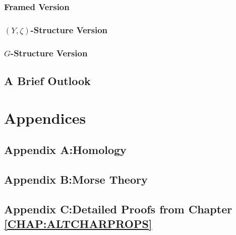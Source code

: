 \documentclass[a4paper,11pt,psamsfonts,reqno]{amsbook}
\newcounter{prpcounter}
\theoremstyle{proposition}
\theoremstyle{proof}
\begin{document}
\section{Framed Version}
\label{sec:vframed}



\section{$(Y,\zeta)$-Structure Version}
\label{sec:vyzstruct}



\section{$G$-Structure Version}
\label{sec:vgstruct}









\chapter{A Brief Outlook}
\label{chap:outlook}





\part*{Appendices}




\chapter*{Appendix A:\quad Homology}
\label{chap:hom}




\chapter*{Appendix B:\quad Morse Theory}
\label{sec:morseth}




\chapter*{Appendix C:\quad Detailed Proofs from Chapter \ref{CHAP:ALTCHARPROPS}}
\label{chap:detailproofs}

\end{document}
